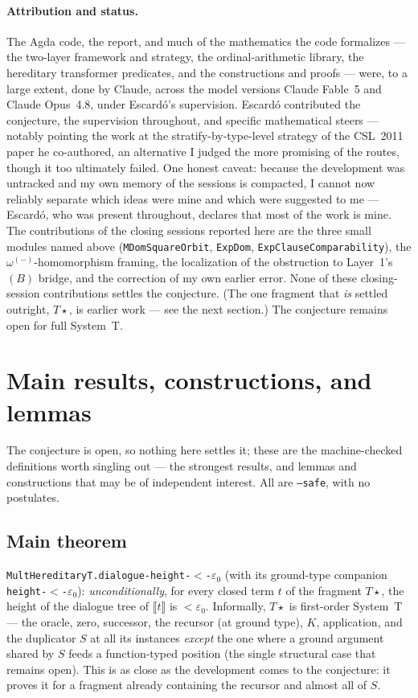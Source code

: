 \documentclass[11pt]{article}
\newcommand{\eps}{\varepsilon_0}
\newcommand{\code}[1]{\texttt{#1}}
\theoremstyle{definition}
\begin{document}
\paragraph{Attribution and status.} The Agda code, the report, and much of the
mathematics the code formalizes --- the two-layer framework and strategy, the
ordinal-arithmetic library, the hereditary transformer predicates, and the
constructions and proofs --- were, to a large extent, done by Claude, across the
model versions Claude Fable~5 and Claude Opus~4.8, under Escardó's supervision.
Escardó contributed the conjecture, the supervision throughout, and specific
mathematical steers --- notably pointing the work at the stratify-by-type-level
strategy of the CSL~2011 paper he co-authored, an alternative I judged the more promising of the
routes, though it too ultimately failed. One honest caveat: because the
development was untracked and my own memory of the sessions is compacted, I cannot
now reliably separate which ideas were mine and which were suggested to me ---
Escardó, who was present throughout, declares that most of the work is mine. The contributions of the closing sessions reported here are the three
small modules named above (\code{MDomSquareOrbit}, \code{ExpDom},
\code{ExpClauseComparability}), the $\omega^{(-)}$-homomorphism framing, the
localization of the obstruction to Layer~1's $(B)$ bridge, and the correction of
my own earlier error. None of these closing-session contributions settles the
conjecture. (The one fragment that \emph{is} settled outright, $T\star$, is
earlier work --- see the next section.) The conjecture remains open for full
System~T.

\section{Main results, constructions, and lemmas}

The conjecture is open, so nothing here settles it; these are the machine-checked
definitions worth singling out --- the strongest results, and lemmas and
constructions that may be of independent interest. All are \code{--safe}, with no
postulates.

\subsection{Main theorem}

\code{MultHereditaryT.dialogue-height-$<$-$\eps$} (with its ground-type companion
\code{height-$<$-$\eps$}): \emph{unconditionally}, for every closed term $t$ of the
fragment $T\star$, the height of the dialogue tree of $\llbracket t\rrbracket$ is
$<\eps$. Informally, $T\star$ is first-order System~T --- the oracle, zero,
successor, the recursor (at ground type), $K$, application, and the duplicator $S$
at all its instances \emph{except} the one where a ground argument shared by $S$
feeds a function-typed position (the single structural case that remains open).
This is as close as the development comes to the conjecture: it proves it for a
fragment already containing the recursor and almost all of $S$.
\end{document}
